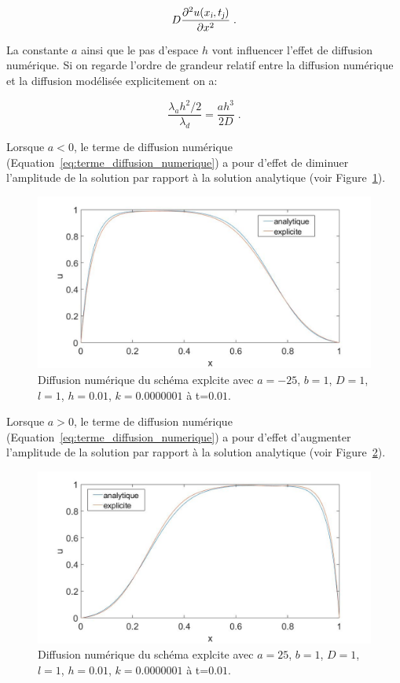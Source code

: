 \documentclass[a4paper, 12pt]{report}
\begin{document}
\begin{equation}
  D \frac{\partial^2 u(x_{\textsl{i}},t_{\textsl{j}})}{\partial x^2}\;.
\end{equation}

La constante $a$ ainsi que le pas d'espace $h$ vont influencer l'effet
de diffusion numérique. Si on regarde l'ordre de grandeur relatif entre
la diffusion numérique et la diffusion modélisée explicitement on a:

\begin{equation}
  \frac{\lambda_a h^2 /2}{\lambda_d} = \frac{a h^3}{2D}\;.
\end{equation}

Lorsque $a<0$, le terme de diffusion numérique (Equation~\ref{eq:terme_diffusion_numerique})
a pour d'effet de diminuer l'amplitude de la solution par
rapport à la solution analytique (voir Figure~\ref{eq:expl_diff_num_a_neg}).

\begin{figure}[H]
  \center
  \includegraphics[scale=0.4]{images/expl_diffusion_num_a_neg.jpg}
  \caption{Diffusion numérique du schéma explcite avec $a=-25$, $b=1$, $D=1$,
  $l=1$, $h=0.01$, $k = 0.0000001$ à t=$0.01$.}
  \label{eq:expl_diff_num_a_neg}
\end{figure}

Lorsque $a>0$, le terme de diffusion numérique (Equation~\ref{eq:terme_diffusion_numerique})
a pour d'effet d'augmenter l'amplitude de la solution par
rapport à la solution analytique (voir Figure~\ref{eq:expl_diff_num_higher_h}).

\begin{figure}[H]
  \center
  \includegraphics[scale=0.4]{images/expl_diffusion_num_higher_h.jpg}
  \caption{Diffusion numérique du schéma explcite avec $a=25$, $b=1$, $D=1$,
  $l=1$, $h=0.01$, $k = 0.0000001$ à t=$0.01$.}
  \label{eq:expl_diff_num_higher_h}
\end{figure}
\end{document}
